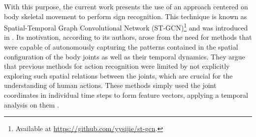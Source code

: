 
With this purpose, the current work presents the use of an approach centered on body skeletal movement to perform sign recognition. This technique is known as Spatial-Temporal Graph Convolutional Network (ST-GCN)\footnote {
    Available at \url{https://github.com/yysijie/st-gcn}.
} and was introduced in \cite{st-gcn-2018}. Its motivation, according to its authors, arose from the need for methods that were capable of autonomously capturing the patterns contained in the spatial configuration of the body joints as well as their temporal dynamics. They argue that previous methods for action recognition were limited by not explicitly exploring such spatial relations between the joints, which are crucial for the understanding of human actions. These methods simply used the joint coordinates in individual time steps to form feature vectors, applying a temporal analysis on them \cite{st-gcn-2018, wang-2012, fernando-2015}.



